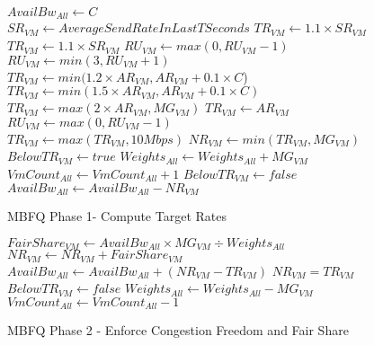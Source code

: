 \begin{figure}[t]
{\footnotesize
\begin{algorithmic}[1]
\State $AvailBw_{All} \gets C$
\\
\State $SR_{VM} \gets AverageSendRateInLastTSeconds$
\State $TR_{VM} \gets 1.1 \times SR_{VM}$
\State $TR_{VM} \gets 1.1 \times SR_{VM}$ 
\State $RU_{VM} \gets max(0, RU_{VM}-1)$
\State $RU_{VM} \gets min(3, RU_{VM} + 1)$
\State $TR_{VM} \gets min(1.2 \times AR_{VM}, AR_{VM} + 0.1 \times C$)
\State $TR_{VM} \gets min(1.5 \times AR_{VM}, AR_{VM} + 0.1 \times C)$
\State $TR_{VM} \gets max(2 \times AR_{VM}, MG_{VM})$
\EndIf
\Else
\State $TR_{VM} \gets AR_{VM}$
\State $RU_{VM} \gets max(0, RU_{VM} - 1)$
\EndIf
\\
\State $TR_{VM} \gets max(TR_{VM}, 10Mbps)$
\State $NR_{VM} \gets min(TR_{VM}, MG_{VM})$
\\
\State $BelowTR_{VM} \gets true$
\State $Weights_{All} \gets Weights_{All} + MG_{VM}$
\State $VmCount_{All} \gets VmCount_{All} + 1$
\Else
\State $BelowTR_{VM} \gets false$
\EndIf
\\
\State $AvailBw_{All} \gets AvailBw_{All} - NR_{VM}$
\EndFor
\end{algorithmic}
}
\caption{MBFQ Phase 1- Compute  Target Rates}
\label{fig:mbfq_p1}
\end{figure}

\begin{figure}[t]
{\footnotesize
\begin{algorithmic}[1]
\State $FairShare_{VM} \gets AvailBw_{All} \times MG_{VM} \div Weights_{All}$
\State $NR_{VM} \gets NR_{VM} + FairShare_{VM}$
\EndIf
\\
\State $AvailBw_{All} \gets AvailBw_{All} + (NR_{VM} - TR_{VM})$
\State $NR_{VM} = TR_{VM}$
\State $BelowTR_{VM} \gets false$
\State $Weights_{All} \gets Weights_{All} - MG_{VM}$
\State $VmCount_{All} \gets VmCount_{All} - 1$
\EndIf
\EndFor
\EndWhile
\end{algorithmic}
}
\caption{MBFQ Phase 2 - Enforce Congestion Freedom and Fair Share}
\label{fig:mbfq_p2}
\end{figure}


